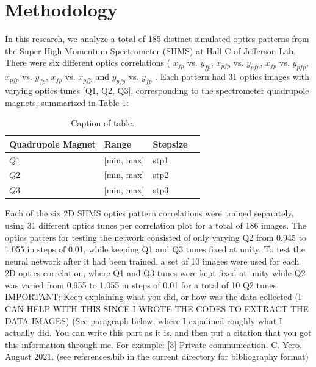 \documentclass[conference]{IEEEtran}
\begin{document}
\section{Methodology}
In this research, we analyze a total of 185 distinct simulated optics patterns from the Super High Momentum Spectrometer (SHMS) at Hall C of Jefferson Lab.
There were six different optics correlations ( $x_{fp}$ vs. $y_{fp}$,  $x_{pfp}$ vs. $y_{pfp}$, $x_{fp}$ vs. $y_{pfp}$,  $x_{pfp}$ vs. $y_{fp}$, $x_{fp}$ vs. $x_{pfp}$ and  $y_{pfp}$ vs. $y_{fp}$ . Each pattern had 31 optics images with varying optics tunes [Q1, Q2, Q3], corresponding to the spectrometer quadrupole magnets, summarized in Table \ref{tab:tune_stpSize}:

\begin{table}[h]
	\begin{center}
		\begin{tabular}{llll} %
                  \hline
                  Quadrupole Magnet & Range & Stepsize \\
                  \hline\hline
	          $Q1$ & [min, max] & stp1  \\
                  $Q2$ & [min, max] & stp2  \\
                  $Q3$ & [min, max] & stp3  \\                       
                  \hline 
		\end{tabular}
	\end{center}
	\caption{Caption of table.}
	\label{tab:tune_stpSize}
\end{table}

Each of the six 2D SHMS optics pattern correlations were trained separately, using 31 different optics tunes
per correlation plot for a total of 186 images. The optics patters for testing the network consisted of only
varying Q2 from 0.945 to 1.055 in steps of 0.01, while keeping Q1 and Q3 tunes fixed at unity.
To test the neural network after it had been trained, a set of 10 images were used for each 2D optics correlation, where Q1 and Q3
tunes were kept fixed at unity while Q2 was varied from 0.955 to 1.055 in steps of 0.01 for a total of 10 Q2 tunes.\\

IMPORTANT: Keep explaining what you did, or how was the data collected (I CAN HELP WITH THIS SINCE I WROTE THE CODES TO EXTRACT THE DATA IMAGES)
(See paragraph below, where I expalined roughly what I actually did. You can write this part as it is, and then put a citation that you got this
information through me. For example:  [3] Private communication. C. Yero. August 2021. (see references.bib in the current directory for bibliography format)
\end{document}
